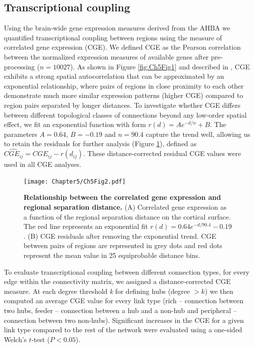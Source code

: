 \subsection{Transcriptional coupling}
\label{sec:CGE}

Using the brain-wide gene expression measures derived from the AHBA we quantified transcriptional coupling between regions using the measure of correlated gene expression (CGE). We defined CGE as the Pearson correlation between the normalized expression measures of available genes after pre-processing ($n=\num{10027}$). As shown in Figure \ref{fig:Ch5Fig1} and described in \citep{Arnatkeviciute2019}, CGE exhibits a strong spatial autocorrelation that can be approximated by an exponential relationship, where pairs of regions in close proximity to each other demonstrate much more similar expression patterns (higher CGE) compared to region pairs separated by longer distances. To investigate whether CGE differs between different topological classes of connections beyond any low-order spatial effect, we fit an exponential function with form $r(d)=Ae^{-d/n}+B$. The parameters $A = 0.64$, $B = -0.19$ and $n=90.4$ capture the trend well, allowing us to retain the residuals for further analysis (Figure \ref{fig:Ch5Fig2}), defined as $\widehat{CGE_{ij}}=CGE_{ij} - r(d_{ij})$. These distance-corrected residual CGE values were used in all CGE analyses.

\begin{figure}[h!]
\begin{center}
\texttt{[image: Chapter5/Ch5Fig2.pdf]}%
\end{center}
\caption{\textbf{Relationship between the correlated gene expression and regional separation distance.}
(A) Correlated gene expression as a function of the regional separation distance on the cortical surface. The red line represents an exponential fit $r(d)=0.64e^{-d/90.4}-0.19$.
(B) CGE residuals after removing the exponential trend. CGE between pairs of regions are represented in grey dots and red dots represent the mean value in 25 equiprobable distance bins.}
\label{fig:Ch5Fig2}
\end{figure}

To evaluate transcriptional coupling between different connection types, for every edge within the connectivity matrix, we assigned a distance-corrected CGE measure. At each degree threshold \textit{k} for defining hubs (degree $>k$) we then computed an average CGE value for every link type (rich -- connection between two hubs, feeder -- connection between a hub and a non-hub and peripheral -- connection between two non-hubs). Significant increases in the CGE for a given link type compared to the rest of the network were evaluated using a one-sided Welch's $t$-test ($P<0.05$).


